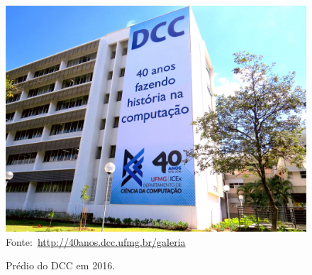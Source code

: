 \documentclass[
	phd, %
	portugues %
]{./ppgccufmg}
\begin{document}
%	
		
		\begin{figure}[ht]
			\centering
			\caption{Prédio do DCC em 2016.}
			\label{fig:exemplo}
			\includegraphics[width=\textwidth]{img/dcc.jpg}
			\small{Fonte:~\url{http://40anos.dcc.ufmg.br/galeria}}
		\end{figure}
	
		\lipsum[5]
		
\end{document}

